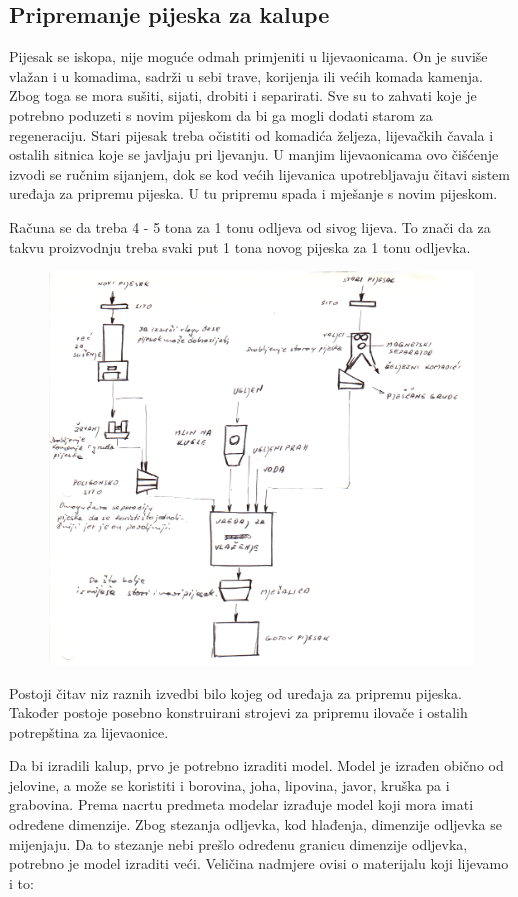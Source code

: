 \documentclass[a4paper,12pt]{article}
\numberwithin{figure}{section}
\begin{document}
\subsection{Pripremanje pijeska za kalupe}
Pijesak se iskopa, nije moguće odmah primjeniti u lijevaonicama. On je suviše vlažan i u komadima, sadrži u sebi trave, korijenja ili većih komada kamenja. Zbog toga se mora sušiti, sijati, drobiti i separirati. Sve su to zahvati koje je potrebno poduzeti s novim pijeskom da bi ga mogli dodati starom za regeneraciju. Stari pijesak treba očistiti od komadića željeza, lijevačkih čavala i ostalih sitnica koje se javljaju pri ljevanju. U manjim lijevaonicama ovo čišćenje izvodi se ručnim sijanjem, dok se kod većih lijevanica upotrebljavaju čitavi sistem uređaja za pripremu pijeska. U tu pripremu spada i mješanje s novim pijeskom.\par
Računa se da treba 4 - 5 tona za 1 tonu odljeva od sivog lijeva. To znači da za takvu proizvodnju treba svaki put 1 tona novog pijeska za 1 tonu odljevka.
\begin{figure}[!h]
\centering
\includegraphics[scale=0.17]{image_58.png}
\end{figure}
\FloatBarrier
Postoji čitav niz raznih izvedbi bilo kojeg od uređaja za pripremu pijeska. Također postoje posebno konstruirani strojevi za pripremu ilovače i ostalih potrepština za lijevaonice. \par
Da bi izradili kalup, prvo je potrebno izraditi model. Model je izrađen obično od jelovine, a može se koristiti i borovina, joha, lipovina, javor, kruška pa i grabovina. Prema nacrtu predmeta modelar izrađuje model koji mora imati određene dimenzije. Zbog stezanja odljevka, kod hlađenja, dimenzije odljevka se mijenjaju. Da to stezanje nebi prešlo određenu granicu dimenzije odljevka, potrebno je model izraditi veći. Veličina nadmjere ovisi o materijalu koji lijevamo i to:\\ 
\end{document}
